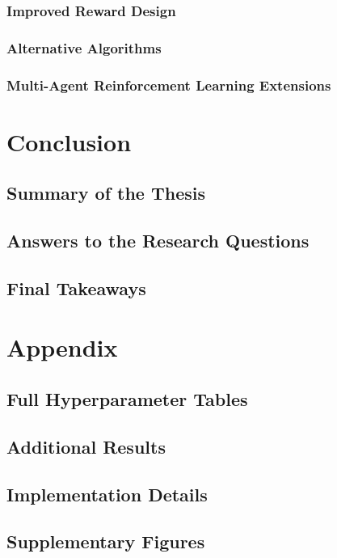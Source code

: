 \documentclass[english,bachelor]{hsluthesis}
\begin{document}
\subsection{Improved Reward Design}
\subsection{Alternative Algorithms}
\subsection{Multi-Agent Reinforcement Learning Extensions}

\chapter{Conclusion}
\section{Summary of the Thesis}
\section{Answers to the Research Questions}
\section{Final Takeaways}



\footnotesize



\appendix
\chapter{Appendix}
\section{Full Hyperparameter Tables}
\section{Additional Results}
\section{Implementation Details}
\section{Supplementary Figures}

\glsaddallunused                                %
\end{document}

